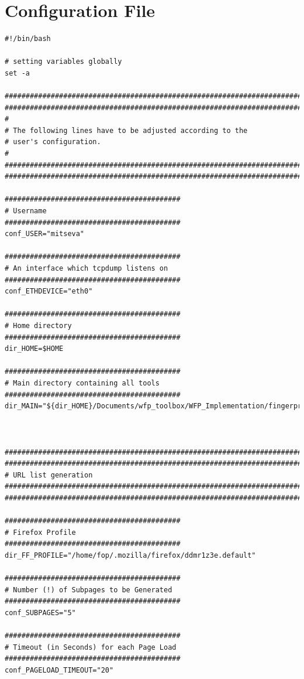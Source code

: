 \section{Configuration File}
\label{sec:config_file}

\begin{verbatim}
#!/bin/bash

# setting variables globally
set -a

#######################################################################
#######################################################################
#
# The following lines have to be adjusted according to the
# user's configuration.
#
#######################################################################
#######################################################################

##########################################
# Username
##########################################
conf_USER="mitseva"

##########################################
# An interface which tcpdump listens on
##########################################
conf_ETHDEVICE="eth0"

##########################################
# Home directory
##########################################
dir_HOME=$HOME

##########################################
# Main directory containing all tools
##########################################
dir_MAIN="${dir_HOME}/Documents/wfp_toolbox/WFP_Implementation/fingerprinting/"



#######################################################################
#######################################################################
# URL list generation
#######################################################################
#######################################################################

##########################################
# Firefox Profile
##########################################
dir_FF_PROFILE="/home/fop/.mozilla/firefox/ddmr1z3e.default"

##########################################
# Number (!) of Subpages to be Generated
##########################################
conf_SUBPAGES="5"

##########################################
# Timeout (in Seconds) for each Page Load
##########################################
conf_PAGELOAD_TIMEOUT="20"


\end{verbatim}
